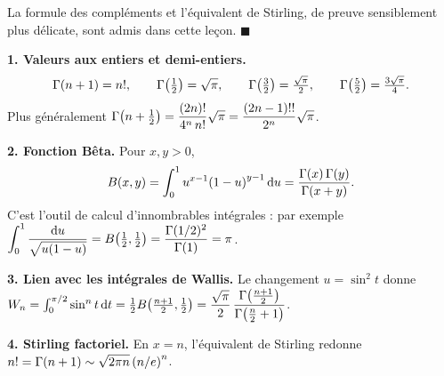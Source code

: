 \begin{mdframed}[style=proofbar]
  \smallskip
  La formule des compléments et l'équivalent de Stirling, de preuve
  sensiblement plus délicate, sont admis dans cette leçon.
  \hfill$\blacksquare$
\end{mdframed}

\decsep{}



\begin{mdframed}[style=exbar]
  \textbf{1. Valeurs aux entiers et demi-entiers.}
  \[
    \Gamma(n+1)=n!,\qquad
    \Gamma\!\left(\tfrac12\right)=\sqrt{\pi},\qquad
    \Gamma\!\left(\tfrac32\right)=\tfrac{\sqrt{\pi}}{2},\qquad
    \Gamma\!\left(\tfrac52\right)=\tfrac{3\sqrt{\pi}}{4}.
  \]
  Plus généralement
  $\Gamma\!\left(n+\tfrac12\right)=\dfrac{(2n)!}{4^n\,n!}\sqrt{\pi}
   =\dfrac{(2n-1)!!}{2^{n}}\sqrt{\pi}$.

  \smallskip\noindent
  \textbf{2. Fonction Bêta.}\enspace{}
  Pour $x,y>0$,
  \[
    B(x,y)=\int_0^1 u^{x-1}{(1-u)}^{y-1}\,\mathrm{d}u
          =\frac{\Gamma(x)\,\Gamma(y)}{\Gamma(x+y)}.
  \]
  C'est l'outil de calcul d'innombrables intégrales : par exemple
  $\displaystyle\int_0^1\frac{\mathrm{d}u}{\sqrt{u(1-u)}}=B\!\left(\tfrac12,\tfrac12\right)
   =\dfrac{\Gamma(1/2)^2}{\Gamma(1)}=\pi$.

  \smallskip\noindent
  \textbf{3. Lien avec les intégrales de Wallis.}\enspace{}
  Le changement $u=\sin^2 t$ donne
  $W_n=\int_0^{\pi/2} \sin^n t\,\mathrm{d}t=\tfrac12 B\!\left(\tfrac{n+1}{2},\tfrac12\right)
   =\dfrac{\sqrt{\pi}}{2}\,\dfrac{\Gamma\!\left(\frac{n+1}{2}\right)}
   {\Gamma\!\left(\frac{n}{2}+1\right)}$.

  \smallskip\noindent
  \textbf{4. Stirling factoriel.}\enspace{}
  En $x=n$, l'équivalent de Stirling redonne
  $n!=\Gamma(n+1)\sim\sqrt{2\pi n}\,{(n/e)}^n$.
\end{mdframed}

\vspace{6pt}

